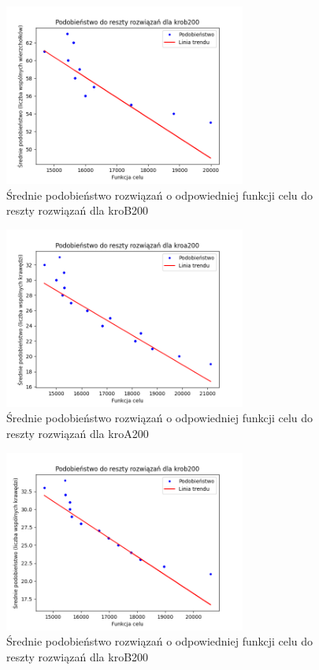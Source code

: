 \documentclass[a4paper]{article}
\begin{document}
\begin{figure}[H]
\centering
\includegraphics[width=300px]{lab6/apb.png}
\caption{Średnie podobieństwo rozwiązań o odpowiedniej funkcji celu do reszty rozwiązań dla kroB200}
\end{figure}

\begin{figure}[H]
\centering
\includegraphics[width=300px]{lab6/aca.png}
\caption{Średnie podobieństwo rozwiązań o odpowiedniej funkcji celu do reszty rozwiązań dla kroA200}
\end{figure}

\begin{figure}[H]
\centering
\includegraphics[width=300px]{lab6/acb.png}
\caption{Średnie podobieństwo rozwiązań o odpowiedniej funkcji celu do reszty rozwiązań dla kroB200}
\end{figure}
\end{document}
